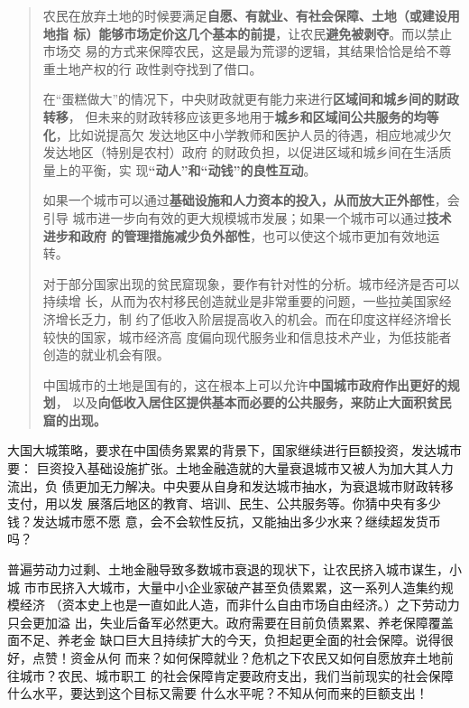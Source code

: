 \begin{enumerate}
\begin{quotation}
    农民在放弃土地的时候要满足\textbf{自愿、有就业、有社会保障、土地（或建设用地指
      标）能够市场定价这几个基本的前提}，让农民\textbf{避免被剥夺}。而以禁止市场交
    易的方式来保障农民，这是最为荒谬的逻辑，其结果恰恰是给不尊重土地产权的行
    政性剥夺找到了借口。

    在“蛋糕做大”的情况下，中央财政就更有能力来进行\textbf{区域间和城乡间的财政转移}，
    但未来的财政转移应该更多地用于\textbf{城乡和区域间公共服务的均等化}，比如说提高欠
    发达地区中小学教师和医护人员的待遇，相应地减少欠发达地区（特别是农村）政府
    的财政负担，以促进区域和城乡间在生活质量上的平衡，实
    现\textbf{“动人”和“动钱”的良性互动}。

    如果一个城市可以通过\textbf{基础设施和人力资本的投入，从而放大正外部性}，会引导
    城市进一步向有效的更大规模城市发展；如果一个城市可以通过\textbf{技术进步和政府
      的管理措施减少负外部性}，也可以使这个城市更加有效地运转。

    对于部分国家出现的贫民窟现象，要作有针对性的分析。城市经济是否可以持续增
    长，从而为农村移民创造就业是非常重要的问题，一些拉美国家经济增长乏力，制
    约了低收入阶层提高收入的机会。而在印度这样经济增长较快的国家，城市经济高
    度偏向现代服务业和信息技术产业，为低技能者创造的就业机会有限。

    中国城市的土地是国有的，这在根本上可以允许\textbf{中国城市政府作出更好的规划}，
    以及\textbf{向低收入居住区提供基本而必要的公共服务，来防止大面积贫民窟的出现。}
  \end{quotation}

  大国大城策略，要求在中国债务累累的背景下，国家继续进行巨额投资，发达城市要：
  巨资投入基础设施扩张。土地金融造就的大量衰退城市又被人为加大其人力流出，负
  债更加无力解决。中央要从自身和发达城市抽水，为衰退城市财政转移支付，用以发
  展落后地区的教育、培训、民生、公共服务等。你猜中央有多少钱？发达城市愿不愿
  意，会不会软性反抗，又能抽出多少水来？继续超发货币吗？

  普遍劳动力过剩、土地金融导致多数城市衰退的现状下，让农民挤入城市谋生，小城
  市市民挤入大城市，大量中小企业家破产甚至负债累累，这一系列人造集约规模经济
  （资本史上也是一直如此人造，而非什么自由市场自由经济。）之下劳动力只会更加溢
  出，失业后备军必然更大。政府需要在目前负债累累、养老保障覆盖面不足、养老金
  缺口巨大且持续扩大的今天，负担起更全面的社会保障。说得很好，点赞！资金从何
  而来？如何保障就业？危机之下农民又如何自愿放弃土地前往城市？农民、城市职工
  的社会保障肯定要政府支出，我们当前现实的社会保障什么水平，要达到这个目标又需要
  什么水平呢？不知从何而来的巨额支出！


\end{enumerate}
